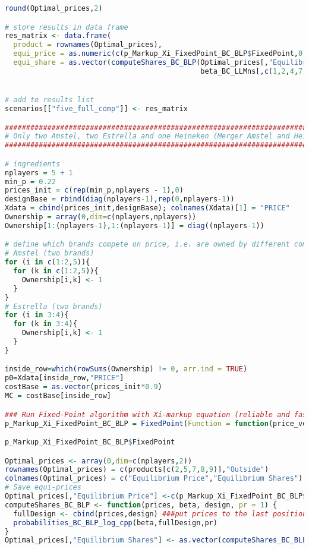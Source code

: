 \begin{lstlisting}[language=R,caption={Computing dynamic Nash equilibria in different competitive scenarios via the fixed point algorithm}, label=lst_nash_esti]
round(Optimal_prices,2)

# store results in data frame
res_matrix <- data.frame(
  product = rownames(Optimal_prices),
  equi_price = as.numeric(c(p_Markup_Xi_FixedPoint_BC_BLP$FixedPoint,0)),
  equi_share = as.vector(computeShares_BC_BLP(Optimal_prices[,"Equilibrium Price"],
                                              beta_BC_LLMns[,c(1,2,4,7,9,10,11)],designBase,pr=1)))


# add to results list
scenarios[["five_full_comp"]] <- res_matrix

###########################################################################
# Only two Amstel, two Estrella and one Heineken (Merger Amstel and Heineken, bc highly correlated betas)
###########################################################################

# ingredients
nplayers = 5 + 1 
min_p = 0.22
prices_init = c(rep(min_p,nplayers - 1),0)
designBase = rbind(diag(nplayers-1),rep(0,nplayers-1))
Xdata = cbind(prices_init,designBase); colnames(Xdata)[1] = "PRICE" 
Ownership = array(0,dim=c(nplayers,nplayers))
Ownership[1:(nplayers-1),1:(nplayers-1)] = diag((nplayers-1))

# define which brands compete on price, i.e. are owned by different companies
# Amstel (two brands)
for (i in c(1:2,5)){
  for (k in c(1:2,5)){
    Ownership[i,k] <- 1
  }
}
# Estrella (two brands)
for (i in 3:4){
  for (k in 3:4){
    Ownership[i,k] <- 1
  }
}

inside_row=which(rowSums(Ownership) != 0, arr.ind = TRUE)
p0=Xdata[inside_row,"PRICE"]
costBase = as.vector(prices_init*0.9)
MC = costBase[inside_row]

### Run Fixed-Point algorithm with Xi-markup equation (reliable and fast: See Table 3 in paper for comparison)
p_Markup_Xi_FixedPoint_BC_BLP = FixedPoint(Function = function(price_vec) FixedPoint_BLP_Xi(price_vec,MC=MC, ownership=Ownership,Xdata=Xdata,beta_draws=beta_BC_LLMns[,(c(1,2,4,7,9,10,11))],pr=1), Inputs = p0, MaxIter = 10000, ConvergenceMetricThreshold = 1e-10, Method = "Anderson")

p_Markup_Xi_FixedPoint_BC_BLP$FixedPoint

Optimal_prices <- array(0,dim=c(nplayers,2))
rownames(Optimal_prices) = c(products[c(2,5,7,8,9)],"Outside")
colnames(Optimal_prices) = c("Equilibrium Price","Equilibrium Shares")
# Save equi-prices
Optimal_prices[,"Equilibrium Price"] <-c(p_Markup_Xi_FixedPoint_BC_BLP$FixedPoint,0)
computeShares_BC_BLP <- function(prices, beta, design, pr = 1) {
  fullDesign <- cbind(prices,design) ###put prices to the last position here
  probabilities_BC_BLP_log_cpp(beta,fullDesign,pr)
}
Optimal_prices[,"Equilibrium Shares"] <- as.vector(computeShares_BC_BLP(Optimal_prices[,"Equilibrium Price"], beta_BC_LLMns[,c(1,2,4,7,9,10,11)],designBase,pr=1))


\end{lstlisting}
